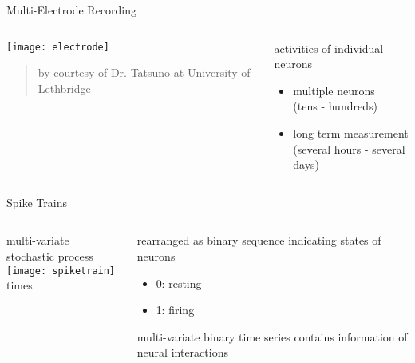 \documentclass[fleqn,aspectratio=1610]{beamer}
\begin{document}
\begin{frame}[label={sec:orgebf69b9}]{Multi-Electrode Recording}
\begin{columns}
\begin{column}{0.5\columnwidth}
\texttt{[image: electrode]}
\begin{quote}
\tiny
by courtesy of Dr. Tatsuno
at University of Lethbridge
\end{quote}
\end{column}
\begin{column}{0.5\columnwidth}
activities of individual neurons

\begin{itemize}
\item multiple neurons\\[0pt]
(tens - hundreds)
\item long term measurement\\[0pt]
(several hours - several days)
\end{itemize}
\end{column}
\end{columns}
\end{frame}

\begin{frame}[label={sec:org4c3b2e1}]{Spike Trains}
\begin{columns}
\begin{column}{0.6\columnwidth}
\centering
multi-variate stochastic process\\[5pt]
\texttt{[image: spiketrain]}\\
times
\end{column}
\begin{column}{0.4\columnwidth}
rearranged as binary sequence
indicating states of neurons
\begin{itemize}
\item 0: resting
\item 1: firing
\end{itemize}
\bigskip

multi-variate binary time series contains
information of neural interactions
\end{column}
\end{columns}
\end{frame}
\end{document}
